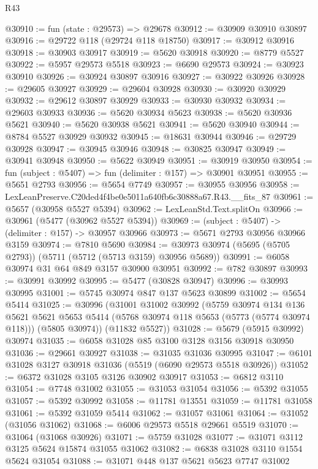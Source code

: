 \begin{lexlean}{R43}
\begin{coremodule}
@30910 := fun (state : @29573) => @29678
@30912 := @30909 @30910 @30897
@30916 := @29722 @118 (@29724 @118 @18750)
@30917 := @30912 @30916
@30918 := @30903 @30917
@30919 := @5620 @30918
@30920 := @8779 @5527
@30922 := @5957 @29573 @5518
@30923 := @6690 @29573
@30924 := @30923 @30910
@30926 := @30924 @30897 @30916
@30927 := @30922 @30926
@30928 := @29605 @30927
@30929 := @29604 @30928
@30930 := @30920 @30929
@30932 := @29612 @30897 @30929
@30933 := @30930 @30932
@30934 := @29603 @30933
@30936 := @5620 @30934 @5623
@30938 := @5620 @30936 @5621
@30940 := @5620 @30938 @5621
@30941 := @5620 @30940
@30944 := @8784 @5527 @30929 @30932
@30945 := @18631 @30944
@30946 := @29729 @30928
@30947 := @30945 @30946
@30948 := @30825 @30947
@30949 := @30941 @30948
@30950 := @5622 @30949
@30951 := @30919 @30950
@30954 := fun (subject : @5407) => fun (delimiter : @157) => @30901 @30951
@30955 := @5651 @2793
@30956 := @5654 @7749
@30957 := @30955 @30956
@30958 := LexLeanPreserve.C20ded4f4be0e5011a640fb6c30888a67.R43.__fits_87
@30961 := @5657 (@30958 @5527 @5394)
@30962 := LexLeanStd.Text.splitOn
@30966 := @30961 (@5477 (@30962 @5527 @5394))
@30969 := (subject : @5407) -> (delimiter : @157) -> @30957 @30966
@30973 := @5671 @2793 @30956 @30966 @3159
@30974 := @7810 @5690
@30984 := @30973 @30974 (@5695 (@5705 @2793)) (@5711 (@5712 (@5713 @3159) @30956 @5689))
@30991 := @6058 @30974 @31 @64 @849 @3157 @30900 @30951
@30992 := @782 @30897
@30993 := @30991 @30992
@30995 := @5477 (@30828 @30947)
@30996 := @30993 @30995
@31001 := @5745 @30974 @847 @137 @5623 @30899
@31002 := @5654 @5414
@31025 := @30996
    (@31001
      @31002
      @30992
      (@5759
        @30974
        @134
        @136
        @5621
        @5621
        @5653
        @5414
        (@5768 @30974 @118 @5653 (@5773 (@5774 @30974 @118)))
        (@5805 @30974))
      (@11832 @5527))
@31028 := @5679 (@5915 @30992) @30974
@31035 := @6058 @31028 @85 @3100 @3128 @3156 @30918 @30950
@31036 := @29661 @30927
@31038 := @31035 @31036 @30995
@31047 := @6101 @31028 @3127 @30918 @31036 (@5519 (@6090 @29573 @5518 @30926))
@31052 := @6372 @31028 @3105 @3126 @30902 @30917
@31053 := @6812 @3110
@31054 := @7748 @31002
@31055 := @31053 @31054
@31056 := @5392 @31055
@31057 := @5392 @30992
@31058 := @11781 @13551
@31059 := @11781 @31058
@31061 := @5392 @31059 @5414
@31062 := @31057 @31061
@31064 := @31052 (@31056 @31062)
@31068 := @6006 @29573 @5518 @29661 @5519
@31070 := @31064 (@31068 @30926)
@31071 := @5759 @31028
@31077 := @31071 @3112 @3125 @5624 @15874 @31055 @31062
@31082 := @6838 @31028 @3110 @1554 @5624 @31054
@31088 := @31071 @448 @137 @5621 @5623 @7747 @31002

\end{coremodule}
\end{lexlean}
